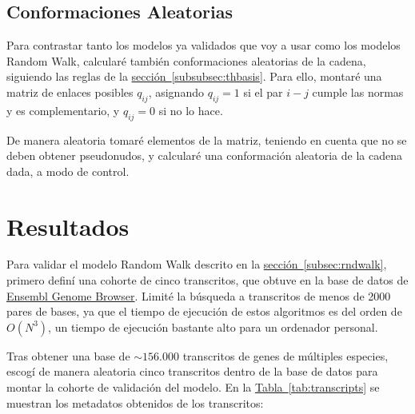 \documentclass[a4paper,11pt,titlepage]{article}
\newcommand{\nr}[2][sección]{\hyperref[#2]{#1~\ref{#2}}}
\theoremstyle{definition}
\begin{document}
\subsection{Conformaciones Aleatorias}\label{subsec:randomconf}

Para contrastar tanto los modelos ya validados que voy a usar como los modelos Random Walk, calcularé también conformaciones aleatorias de la cadena, siguiendo las reglas de la \nr[sección]{subsubsec:thbasis}. Para ello, montaré una matriz de enlaces posibles $q_{ij}$, asignando $q_{ij} = 1$ si el par $i-j$ cumple las normas y es complementario, y $q_{ij} = 0$ si no lo hace. 

De manera aleatoria tomaré elementos de la matriz, teniendo en cuenta que no se deben obtener pseudonudos, y calcularé una conformación aleatoria de la cadena dada, a modo de control.


\section{Resultados}\label{sec:res}

Para validar el modelo Random Walk descrito en la \nr[sección]{subsec:rndwalk}, primero definí una cohorte de cinco transcritos, que obtuve en la base de datos de \href{https://www.ensembl.org/index.html}{Ensembl Genome Browser}. Limité la búsqueda a transcritos de menos de 2000 pares de bases, ya que el tiempo de ejecución de estos algoritmos es del orden de $O(N^3)$, un tiempo de ejecución bastante alto para un ordenador personal.

Tras obtener una base de $\sim156.000$ transcritos de genes de múltiples especies, escogí de manera aleatoria cinco transcritos dentro de la base de datos para montar la cohorte de validación del modelo. En la \nr[Tabla]{tab:transcripts} se muestran los metadatos obtenidos de los transcritos:
\end{document}
